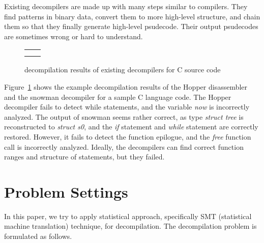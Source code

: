 \documentclass[senior,final,11pt]{iscs-thesis}
\begin{document}
Existing decompilers are made up with many steps similar to compilers. 
They find patterns in binary data, convert them to more high-level structure, and chain them so that they finally generate high-level psudecode.
Their output psudecodes are sometimes wrong or hard to understand.




\begin{figure}
	\begin{tabular}{cc}
		\begin{minipage}[c]{0.5\hsize}
			
		\end{minipage}
		\\
		\begin{minipage}[c]{0.5\hsize}
			
		\end{minipage}
		\begin{minipage}[c]{0.5\hsize}
			
		\end{minipage}
	\end{tabular}
	\vspace*{-0.6cm}
	\caption{ decompilation results of existing decompilers for C source code}
	\label{fig:cw}
\end{figure}


Figure~\ref{fig:cw} shows the example decompilation results of the Hopper disassembler and the snowman decompiler 
for a sample C language code.
The Hopper decompiler fails to detect while statements, and the variable {\sl now} is incorrectly analyzed.
The output of snowman seems rather correct, as type {\sl struct tree} is reconstructed to {\sl struct s0}, 
and the {\sl if} statement and {\sl while} statement are correctly restored. 
However, it fails to detect the function epilogue, and the {\sl free} function call is incorrectly analyzed.
Ideally, the decompilers can find correct function ranges and structure of statements, but they failed.


\section{Problem Settings}

In this paper, we try to apply statistical approach, specifically SMT (statistical machine translation) technique, for decompilation.
The decompilation problem is formulated as follows. 
\end{document}
